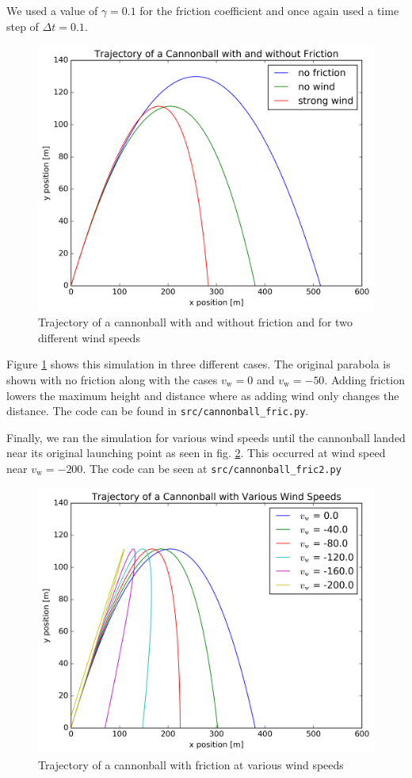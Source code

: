 \documentclass[a4paper,11pt,bibtotoc]{scrartcl}
\begin{document}
We used a value of $\gamma = 0.1$ for the friction coefficient and
once again used a time step of $\Delta t = 0.1$.

\begin{figure}
  \includegraphics[width=0.7\linewidth]{../fig/cannonball2.png}
  \centering
  \caption{Trajectory of a cannonball with and without friction and
    for two different wind speeds}
  \label{fig:cannonball2}
\end{figure}

Figure \ref{fig:cannonball2} shows this simulation in three different
cases. The original parabola is shown with no friction along with the
cases $v_\mathrm{w} = 0$ and $v_\mathrm{w} = -50$. Adding friction
lowers the maximum height and distance where as adding wind only
changes the distance. The code can be found in
\texttt{src/cannonball\_fric.py}.

Finally, we ran the simulation for various wind speeds until the
cannonball landed near its original launching point as seen in
fig. \ref{fig:cannonball3}. This occurred at wind speed near
$v_\mathrm{w} = -200$. The code can be seen at
\texttt{src/cannonball\_fric2.py}

\begin{figure}
  \includegraphics[width=0.7\linewidth]{../fig/cannonball3.png}
  \centering
  \caption{Trajectory of a cannonball with friction at various wind
    speeds}
  \label{fig:cannonball3}
\end{figure}
\end{document}
